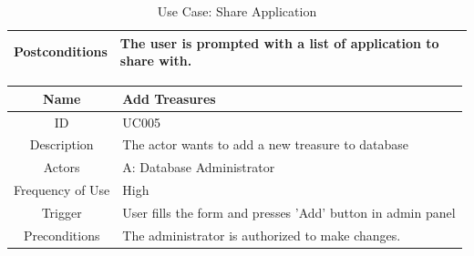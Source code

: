\documentclass[12pt, a4paper, oneside]{article}
\begin{document}
\begin{table}[H]
\begin{tabularx}{\linewidth}{|c|X|}
Postconditions      & The user is prompted with a list of application to share with.                                                                                                                                        \\ \hline
\end{tabularx}
\caption{Use Case: Share Application}
\label{uc-view-points}
\end{table}

\begin{table}[H]
\begin{tabularx}{\linewidth}{|c|X|}
\hline
Name                & Add Treasures                                                                                                                                                                                                                      \\ \hline
ID                  & UC005                                                                                                                                                                                                                       \\ \hline
Description         & The actor wants to add a new treasure to database                                                                                                                                                    \\ \hline
Actors              & A: Database Administrator                                                                                                                                                                                                 \\ \hline
Frequency of Use    & High                                                                                                                                                                                                                    \\ \hline
Trigger             & User fills the form and presses 'Add' button in admin panel                                                                                                                                                                                           \\ \hline
Preconditions       & The administrator is authorized to make changes.                                                                                                                                                                                                                           \\ \hline

\end{tabularx}
\end{table}
\end{document}
